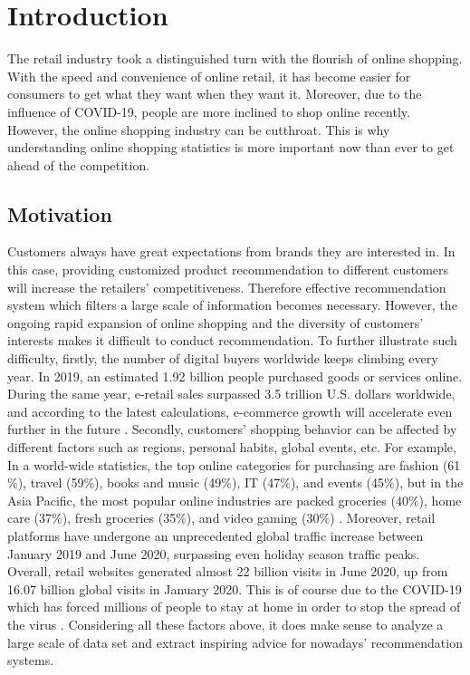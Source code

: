 \documentclass[sigconf,authordraft]{acmart}
\begin{document}
\maketitle

\section{Introduction}

The retail industry took a distinguished turn with the flourish of online shopping. With the speed and convenience of online retail, it has become easier for consumers to get what they want when they want it. Moreover, due to the influence of COVID-19, people are more inclined to shop online recently. However, the online shopping industry can be cutthroat. This is why understanding online shopping statistics is more important now than ever to get ahead of the competition. 

\subsection{Motivation}

Customers always have great expectations from brands they are interested in. In this case, providing customized product recommendation to different customers will increase the retailers’ competitiveness. Therefore effective recommendation system which filters a large scale of information becomes necessary. However, the ongoing rapid expansion of online shopping and the diversity of customers’ interests makes it difficult to conduct recommendation. To further illustrate such difficulty, firstly, the number of digital buyers worldwide keeps climbing every year. In 2019, an estimated 1.92 billion people purchased goods or services online. During the same year, e-retail sales surpassed 3.5 trillion U.S. dollars worldwide, and according to the latest calculations, e-commerce growth will accelerate even further in the future \cite{online-shopping}. Secondly, customers’ shopping behavior can be affected by different factors such as regions, personal habits, global events, etc. For example, In a world-wide statistics, the top online categories for purchasing are fashion (61$\%$), travel (59$\%$), books and music (49$\%$), IT (47$\%$), and events (45$\%$), but in the Asia Pacific, the most popular online industries are packed groceries (40$\%$), home care (37$\%$), fresh groceries (35$\%$), and video gaming (30$\%$) \cite{e-commerce}. Moreover, retail platforms have undergone an unprecedented global traffic increase between January 2019 and June 2020, surpassing even holiday season traffic peaks. Overall, retail websites generated almost 22 billion visits in June 2020, up from 16.07 billion global visits in January 2020. This is of course due to the COVID-19 which has forced millions of people to stay at home in order to stop the spread of the virus \cite{covid-19}. 
Considering all these factors above, it does make sense to analyze a large scale of data set and extract inspiring advice for nowadays’ recommendation systems.
\end{document}
